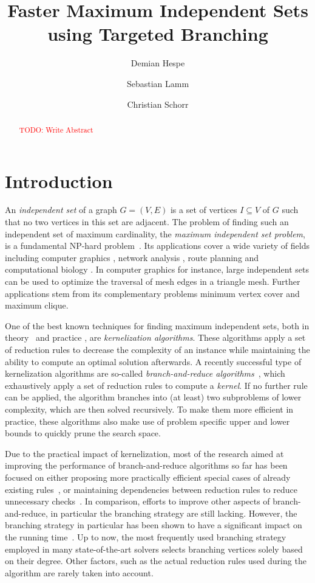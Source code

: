 \documentclass[a4paper,UKenglish,cleveref, autoref, thm-restate]{lipics-v2021}
\title{Faster Maximum Independent Sets using Targeted Branching} %
\author{Demian Hespe}{Karlsruhe Institute of Technology, Institute for
  Theoretical Informatics, Germany}{hespe@kit.edu}{}{}
\author{Sebastian Lamm}{Karlsruhe Institute of Technology, Institute for
  Theoretical Informatics, Germany}{lamm@kit.edu}{}{\textcolor{red} {TODO: Add funding}}
\author{Christian Schorr}{Karlsruhe Institute of Technology, Institute for
  Theoretical Informatics, Germany}{christian.schorr@student.kit.edu}{}{}
\begin{document}
\maketitle

\begin{abstract}
  \textcolor{red}{TODO: Write Abstract}
\end{abstract}

\newpage

\section{Introduction}
An \emph{independent set} of a graph $G = (V,E)$ is a set of vertices $I \subseteq V$ of $G$ such that no two vertices in this set are adjacent. The problem of finding such an independent set of maximum cardinality, the \emph{maximum independent set problem}, is a fundamental NP-hard problem~\cite{Garey1974}. Its applications cover a wide variety of fields including computer graphics \cite{CG}, network analysis \cite{NW}, route planning \cite{RP} and computational biology \cite{BIO1, BIO2}. In computer graphics for instance, large independent sets can be used to optimize the traversal of mesh edges in a triangle mesh. Further applications stem from its complementary problems minimum vertex cover and maximum clique.

One of the best known techniques for finding maximum independent sets, both in theory~\cite{XiaoNagamochi, ChenXiaKanj} and practice \cite{AkibaIwata}, are \emph{kernelization algorithms}. These algorithms apply a set of reduction rules to decrease the complexity of an instance while maintaining the ability to compute an optimal solution afterwards. A recently successful type of kernelization algorithms are so-called \emph{branch-and-reduce algorithms}~\cite{AkibaIwata,WGYC}, which exhaustively apply a set of reduction rules to compute a \emph{kernel}. If no further rule can be applied, the algorithm branches into (at least) two subproblems of lower complexity, which are then solved recursively. To make them more efficient in practice, these algorithms also make use of problem specific upper and lower bounds to quickly prune the search space.

Due to the practical impact of kernelization, most of the research aimed at improving the performance of branch-and-reduce algorithms so far has been focused on either proposing more practically efficient special cases of already existing rules~\cite{ChangKern,dahlum2016accelerating}, or maintaining dependencies between reduction rules to reduce unnecessary checks~\cite{alsahafy2020computing,hespe2019scalable}. In comparison, efforts to improve other aspects of branch-and-reduce, in particular the branching strategy are still lacking. However, the branching strategy in particular has been shown to have a significant impact on the running time~\cite{AkibaIwata}. Up to now, the most frequently used branching strategy employed in many state-of-the-art solvers selects branching vertices solely based on their degree. Other factors, such as the actual reduction rules used during the algorithm are rarely taken into account.
\end{document}
